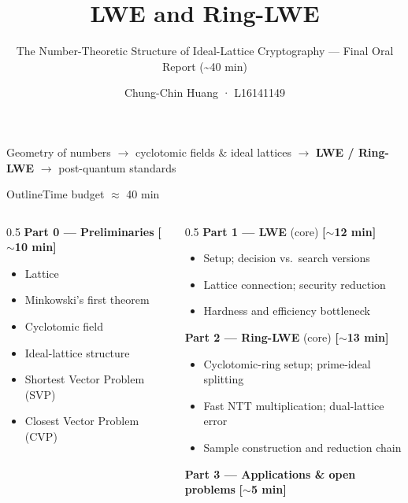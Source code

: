 \documentclass[aspectratio=169, 11pt]{beamer}
\title{LWE and Ring-LWE}
\subtitle{The Number-Theoretic Structure of Ideal-Lattice Cryptography --- Final Oral Report (\textasciitilde 40 min)}
\author{Chung-Chin Huang · L16141149}
\institute{Number Theory I · Spring 2026 · National Cheng Kung University}
\date{}
\newcommand{\timetag}[1]{{\small\color{accentlt!50!white}\textbf{[#1]}}}
\begin{document}
\begin{frame}[plain]
  \titlepage
  \begin{center}\small\color{gray}
    Geometry of numbers $\to$ cyclotomic fields \& ideal lattices $\to$ \textbf{LWE / Ring-LWE} $\to$ post-quantum standards
  \end{center}
\end{frame}

\begin{frame}{Outline}{Time budget $\approx$ 40 min}
  \begin{columns}[T]
    \begin{column}{0.5\textwidth}
      \textbf{Part 0 --- Preliminaries} \timetag{$\sim$10 min}
      \begin{itemize}
        \item Lattice
        \item Minkowski's first theorem
        \item Cyclotomic field
        \item Ideal-lattice structure
        \item Shortest Vector Problem (SVP)
        \item Closest Vector Problem (CVP)
      \end{itemize}
    \end{column}
    \begin{column}{0.5\textwidth}
      \textbf{Part 1 --- LWE} (core) \timetag{$\sim$12 min}\\[-2pt]
      \begin{itemize}\small
        \item Setup; decision vs.\ search versions
        \item Lattice connection; security reduction
        \item Hardness and efficiency bottleneck
      \end{itemize}
      \vspace{4pt}
      \textbf{Part 2 --- Ring-LWE} (core) \timetag{$\sim$13 min}\\[-2pt]
      \begin{itemize}\small
        \item Cyclotomic-ring setup; prime-ideal splitting
        \item Fast NTT multiplication; dual-lattice error
        \item Sample construction and reduction chain
      \end{itemize}
      \vspace{4pt}
      \textbf{Part 3 --- Applications \& open problems} \timetag{$\sim$5 min}
    \end{column}
  \end{columns}
\end{frame}
\end{document}

